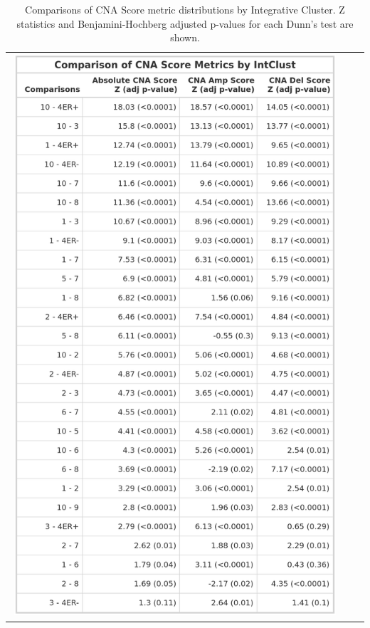\begin{table}[!ht]
\caption[Comparisons of CNA Score metric distributions by Integrative Cluster.]{Comparisons of CNA Score metric distributions by Integrative Cluster. Z statistics and Benjamini-Hochberg adjusted p-values for each Dunn's test are shown.}
\begin{minipage}[c]{0.45\textwidth}
\centering
\begin{tabular}{ccc}
\includegraphics[width=0.98\textwidth]{../tables/Chapter_2/Global_CNA_Score_Metric_IntClust_Comparisons_1.png}
\end{tabular}

\end{minipage}
\end{table}
